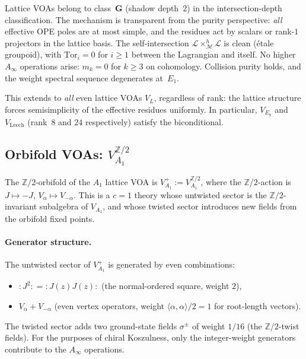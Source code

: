 \documentclass[11pt]{article}
\newcommand{\Z}{\mathbb{Z}}
\providecommand{\mathscr}{\mathcal}
\begin{document}
\begin{remark}
Lattice VOAs belong to class~$\mathbf{G}$ (shadow depth~$2$)
in the intersection-depth classification.  The mechanism is
transparent from the purity perspective: \emph{all} effective
OPE poles are at most simple, and the residues act by scalars
or rank-$1$ projectors in the lattice basis.  The
self-intersection $\mathscr{L} \times_{\mathscr{M}}^h
\mathscr{L}$ is clean (\'etale groupoid), with
$\mathrm{Tor}_i = 0$ for $i \geq 1$ between the Lagrangian
and itself.  No higher $A_\infty$ operations arise:
$m_k = 0$ for $k \geq 3$ on cohomology.  Collision purity
holds, and the weight spectral sequence degenerates
at~$E_1$.

This extends to \emph{all} even lattice VOAs $V_L$,
regardless of rank: the lattice structure forces semisimplicity
of the effective residues uniformly.  In particular,
$V_{E_8}$ and $V_{\mathrm{Leech}}$ (rank~$8$ and $24$
respectively) satisfy the biconditional.
\end{remark}

\subsection{Orbifold VOAs: $V_{A_1}^{\Z/2}$}
\label{subsec:orbifold-purity}

The $\Z/2$-orbifold of the $A_1$ lattice VOA is
$V_{A_1}^{+} := V_{A_1}^{\Z/2}$, where the
$\Z/2$-action is $J \mapsto -J$,
$V_\alpha \mapsto V_{-\alpha}$.  This is a $c = 1$ theory
whose untwisted sector is the $\Z/2$-invariant
subalgebra of $V_{A_1}$, and whose twisted sector
introduces new fields from the orbifold fixed points.

\paragraph{Generator structure.}
The untwisted sector of $V_{A_1}^{+}$ is generated by
even combinations:
\begin{itemize}[nosep]
\item $:J^2: = :J(z)J(z):$ (the normal-ordered square, weight $2$),
\item $V_\alpha + V_{-\alpha}$ (even vertex operators, weight
  $\langle\alpha,\alpha\rangle/2 = 1$ for root-length vectors).
\end{itemize}
The twisted sector adds two ground-state fields
$\sigma^{\pm}$ of weight $1/16$ (the
$\Z/2$-twist fields).  For the purposes of
chiral Koszulness, only the integer-weight generators
contribute to the $A_\infty$ operations.
\end{document}
